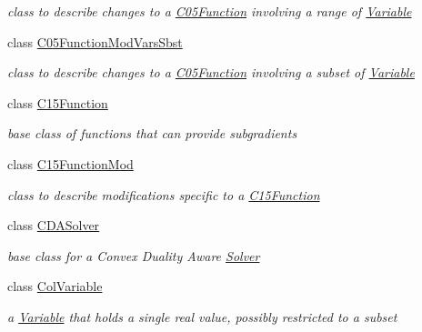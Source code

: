 \begin{DoxyCompactItemize}
\begin{DoxyCompactList}\small\item\em class to describe changes to a \mbox{\hyperlink{class_s_m_spp__di__unipi__it_1_1_c05_function}{C05\+Function}} involving a range of \mbox{\hyperlink{class_s_m_spp__di__unipi__it_1_1_variable}{Variable}} \end{DoxyCompactList}\item 
class \mbox{\hyperlink{class_s_m_spp__di__unipi__it_1_1_c05_function_mod_vars_sbst}{C05\+Function\+Mod\+Vars\+Sbst}}
\begin{DoxyCompactList}\small\item\em class to describe changes to a \mbox{\hyperlink{class_s_m_spp__di__unipi__it_1_1_c05_function}{C05\+Function}} involving a subset of \mbox{\hyperlink{class_s_m_spp__di__unipi__it_1_1_variable}{Variable}} \end{DoxyCompactList}\item 
class \mbox{\hyperlink{class_s_m_spp__di__unipi__it_1_1_c15_function}{C15\+Function}}
\begin{DoxyCompactList}\small\item\em base class of functions that can provide subgradients \end{DoxyCompactList}\item 
class \mbox{\hyperlink{class_s_m_spp__di__unipi__it_1_1_c15_function_mod}{C15\+Function\+Mod}}
\begin{DoxyCompactList}\small\item\em class to describe modifications specific to a \mbox{\hyperlink{class_s_m_spp__di__unipi__it_1_1_c15_function}{C15\+Function}} \end{DoxyCompactList}\item 
class \mbox{\hyperlink{class_s_m_spp__di__unipi__it_1_1_c_d_a_solver}{C\+D\+A\+Solver}}
\begin{DoxyCompactList}\small\item\em base class for a Convex Duality Aware \mbox{\hyperlink{class_s_m_spp__di__unipi__it_1_1_solver}{Solver}} \end{DoxyCompactList}\item 
class \mbox{\hyperlink{class_s_m_spp__di__unipi__it_1_1_col_variable}{Col\+Variable}}
\begin{DoxyCompactList}\small\item\em a \mbox{\hyperlink{class_s_m_spp__di__unipi__it_1_1_variable}{Variable}} that holds a single real value, possibly restricted to a subset \end{DoxyCompactList}\item 

\end{DoxyCompactItemize}
